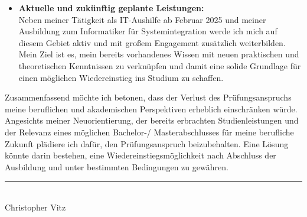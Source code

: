 \documentclass[a4paper,12pt]{article}
\begin{document}
\begin{itemize}[label={-}, labelwidth=2em, left=1em]
\item \textbf{Aktuelle und zukünftig geplante Leistungen:}\\
Neben meiner Tätigkeit als IT-Aushilfe ab Februar 2025 und meiner Ausbildung zum Informatiker für Systemintegration werde ich mich auf diesem Gebiet aktiv und mit großem Engagement zusätzlich weiterbilden.
Mein Ziel ist es, mein bereits vorhandenes Wissen mit neuen praktischen und theoretischen Kenntnissen zu verknüpfen und damit eine solide Grundlage für einen möglichen Wiedereinstieg ins Studium zu schaffen.
\\
\end{itemize}

Zusammenfassend möchte ich betonen, dass der Verlust des Prüfungsanspruchs meine beruflichen und akademischen Perspektiven erheblich einschränken würde.
Angesichts meiner Neuorientierung, der bereits erbrachten Studienleistungen und der Relevanz eines möglichen Bachelor-/ Masterabschlusses für meine berufliche Zukunft plädiere ich dafür, den Prüfungsanspruch beizubehalten.
Eine Lösung könnte darin bestehen, eine Wiedereinstiegsmöglichkeit nach Abschluss der Ausbildung und unter bestimmten Bedingungen zu gewähren.

\vspace{2cm}
\rule{5cm}{0.3pt}\\
Christopher Vitz
\end{document}
